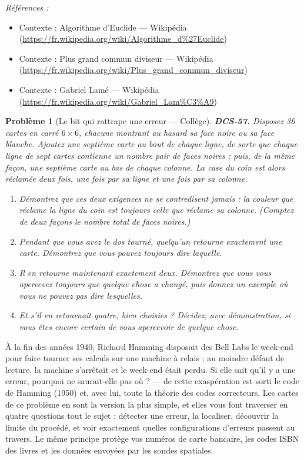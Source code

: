 \documentclass[11pt]{article}
\newtheorem{problem}{Problème}
\newenvironment{refs}{\par\small\noindent\emph{Références :}\begin{itemize}\setlength\itemsep{0pt}}{\end{itemize}\normalsize}
\begin{document}
\begin{refs}
\item Contexte : Algorithme d'Euclide --- Wikipédia (\url{https://fr.wikipedia.org/wiki/Algorithme_d%27Euclide})
\item Contexte : Plus grand commun diviseur --- Wikipédia (\url{https://fr.wikipedia.org/wiki/Plus_grand_commun_diviseur})
\item Contexte : Gabriel Lamé --- Wikipédia (\url{https://fr.wikipedia.org/wiki/Gabriel_Lam%C3%A9})
\end{refs}

\bigskip

\begin{problem}[{Le bit qui rattrape une erreur --- Collège}]
\textbf{DCS-57.} Disposez 36 cartes en carré $ 6 \times 6 $, chacune montrant au hasard
sa face noire ou sa face blanche. Ajoutez une septième carte au bout de chaque ligne, de
sorte que chaque ligne de sept cartes contienne un nombre pair de faces noires ; puis, de la
même façon, une septième carte au bas de chaque colonne. La case du coin est alors réclamée
deux fois, une fois par sa ligne et une fois par sa colonne.
\begin{enumerate}
\item[(a)] Démontrez que ces deux exigences ne se contredisent jamais : la couleur que réclame la
ligne du coin est toujours celle que réclame sa colonne. (Comptez de deux façons le nombre
total de faces noires.)
\item[(b)] Pendant que vous avez le dos tourné, quelqu'un retourne exactement une carte. Démontrez
que vous pouvez toujours dire laquelle.
\item[(c)] Il en retourne maintenant exactement deux. Démontrez que vous vous apercevez toujours
que quelque chose a changé, puis donnez un exemple où vous ne pouvez pas dire lesquelles.
\item[(d)] Et s'il en retournait quatre, bien choisies ? Décidez, avec démonstration, si vous êtes
encore certain de vous apercevoir de quelque chose.
\end{enumerate}

\end{problem}

\noindent À la fin des années 1940, Richard Hamming disposait des Bell Labs le
week-end pour faire tourner ses calculs sur une machine à relais ; au moindre défaut de
lecture, la machine s'arrêtait et le week-end était perdu. \og{} Si elle sait qu'il y a une
erreur, pourquoi ne saurait-elle pas où ? \fg{} --- de cette exaspération est sorti le code de
Hamming (1950) et, avec lui, toute la théorie des codes correcteurs. Les cartes de ce
problème en sont la version la plus simple, et elles vous font traverser en quatre questions
tout le sujet : détecter une erreur, la localiser, découvrir la limite du procédé, et voir
exactement quelles configurations d'erreurs passent au travers. Le même principe protège
vos numéros de carte bancaire, les codes ISBN des livres et les données envoyées par les
sondes spatiales.
\end{document}
